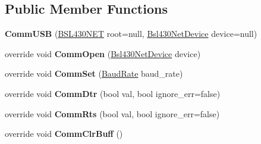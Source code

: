 \subsection*{Public Member Functions}
\begin{DoxyCompactItemize}
\item 
\mbox{\label{class_b_s_l430___n_e_t_1_1_comm_1_1_comm_u_s_b_a7b3c1be5c4d7a436f5e2c7ab8c3bd39a}} 
{\bfseries Comm\+U\+SB} (\mbox{\hyperlink{class_b_s_l430___n_e_t_1_1_b_s_l430_n_e_t}{B\+S\+L430\+N\+ET}} root=null, \mbox{\hyperlink{class_b_s_l430___n_e_t_1_1_bsl430_net_device}{Bsl430\+Net\+Device}} device=null)
\item 
\mbox{\label{class_b_s_l430___n_e_t_1_1_comm_1_1_comm_u_s_b_adecb23096743c7abe23cc428cc5ab074}} 
override void {\bfseries Comm\+Open} (\mbox{\hyperlink{class_b_s_l430___n_e_t_1_1_bsl430_net_device}{Bsl430\+Net\+Device}} device)
\item 
\mbox{\label{class_b_s_l430___n_e_t_1_1_comm_1_1_comm_u_s_b_a81697dd1d56f474534013c7fe24b830a}} 
override void {\bfseries Comm\+Set} (\mbox{\hyperlink{namespace_b_s_l430___n_e_t_a8d30c263598635a481840944d38aeb70}{Baud\+Rate}} baud\+\_\+rate)
\item 
\mbox{\label{class_b_s_l430___n_e_t_1_1_comm_1_1_comm_u_s_b_a3846f19f970360e284a6aa9f77192ba5}} 
override void {\bfseries Comm\+Dtr} (bool val, bool ignore\+\_\+err=false)
\item 
\mbox{\label{class_b_s_l430___n_e_t_1_1_comm_1_1_comm_u_s_b_a67c20975eb0987ccce2a3feea438ee51}} 
override void {\bfseries Comm\+Rts} (bool val, bool ignore\+\_\+err=false)
\item 
\mbox{\label{class_b_s_l430___n_e_t_1_1_comm_1_1_comm_u_s_b_a913d0b200d774915b4c7094d79b992c2}} 
override void {\bfseries Comm\+Clr\+Buff} ()
\item 
\mbox{\label{class_b_s_l430___n_e_t_1_1_comm_1_1_comm_u_s_b_a6d8df943a2f8eec283d7a16654a8eb2f}} 

\end{DoxyCompactItemize}
